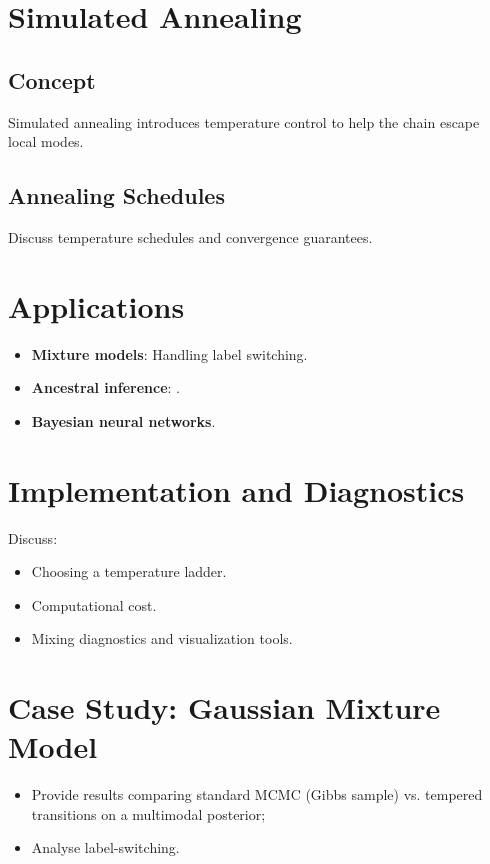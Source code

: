 \documentclass[11pt]{article}
\begin{document}
\section{Simulated Annealing}
\subsection{Concept}
Simulated annealing introduces temperature control to help the chain escape local modes.

\subsection{Annealing Schedules}
Discuss temperature schedules and convergence guarantees.

\section{Applications}
\begin{itemize}
    \item \textbf{Mixture models}: Handling label switching.
    \item \textbf{Ancestral inference}: \citep{geyer1995annealing}.
    \item \textbf{Bayesian neural networks}.
\end{itemize}

\section{Implementation and Diagnostics}
Discuss:
\begin{itemize}
    \item Choosing a temperature ladder.
    \item Computational cost.
    \item Mixing diagnostics and visualization tools.
\end{itemize}

\section{Case Study: Gaussian Mixture Model}

\begin{itemize}
    \item Provide results comparing standard MCMC (Gibbs sample) vs. tempered transitions on a multimodal posterior;
    \item Analyse label-switching.
\end{itemize}
\end{document}
